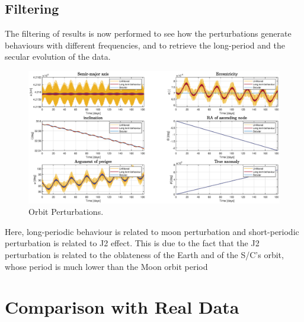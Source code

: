 \documentclass{article}
\begin{document}
\subsection{Filtering} 

The filtering of results is now performed to see how the perturbations generate behaviours with different frequencies, and to retrieve the long-period and the secular evolution of the data.

\begin{figure}[H]
	\centering
	\includegraphics[width=1\textwidth]{filter0.5year.eps}
	\caption{Orbit Perturbations.}
	\label{fig:relative_error10yrs}
\end{figure}

Here, long-periodic behaviour is related to moon perturbation and short-periodic perturbation is related to J2 effect. This is due to the fact that the J2 perturbation is related to the oblateness of the Earth and of the S/C’s orbit, whose period is much lower than the Moon orbit period

\section{Comparison with Real Data}
\end{document}

